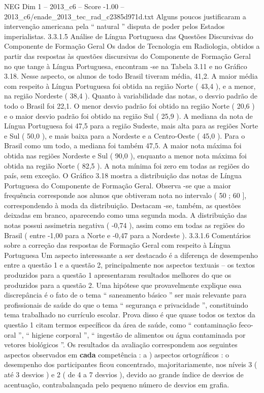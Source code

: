 \begin{textsample}{NEG Dim 1 – 2013\_c6 – Score -1.00 – 2013\_c6/enade\_2013\_tec\_rad\_c2385d971d.txt}
Alguns poucos justificaram a intervenção americana pela “ natural ” disputa de poder pelos Estados imperialistas. 3.3.1.5 Análise de Língua Portuguesa das Questões Discursivas do Componente de Formação Geral Os dados de Tecnologia em Radiologia, obtidos a partir das respostas às questões discursivas do Componente de Formação Geral no que tange à Língua Portuguesa, encontram -se na Tabela 3.11 e no Gráfico 3.18.
Nesse aspecto, os alunos de todo Brasil tiveram média, 41,2.
A maior média com respeito à Língua Portuguesa foi obtida na região Norte ( 43,4 ), e a menor, na região Nordeste ( 38,4 ).
Quanto à variabilidade das notas, o desvio padrão de todo o Brasil foi 22,1.
O menor desvio padrão foi obtido na região Norte ( 20,6 ) e o maior desvio padrão foi obtido na região Sul ( 25,9 ).
A mediana da nota de Língua Portuguesa foi 47,5 para a região Sudeste, mais alta para as regiões Norte e Sul ( 50,0 ), e mais baixa para a Nordeste e a Centro-Oeste ( 45,0 ).
Para o Brasil como um todo, a mediana foi também 47,5.
A maior nota máxima foi obtida nas regiões Nordeste e Sul ( 90,0 ), enquanto a menor nota máxima foi obtida na região Norte ( 82,5 ).
A nota mínima foi zero em todas as regiões do país, sem exceção.
O Gráfico 3.18 mostra a distribuição das notas de Língua Portuguesa do Componente de Formação Geral.
Observa -se que a maior frequência corresponde aos alunos que obtiveram nota no intervalo ( 50 ; 60 ], correspondendo à moda da distribuição.
Destacam -se, também, as questões deixadas em branco, aparecendo como uma segunda moda.
A distribuição das notas possui assimetria negativa ( -0,74 ), assim como em todas as regiões do Brasil ( entre -1,00 para a Norte e -0,47 para a Nordeste ). 3.3.1.6 Comentários sobre a correção das respostas de Formação Geral com respeito à Língua Portuguesa Um aspecto interessante a ser destacado é a diferença de desempenho entre a questão 1 e a questão 2, principalmente nos aspectos textuais – os textos produzidos para a questão 1 apresentaram resultados melhores do que os produzidos para a questão 2.
Uma hipótese que provavelmente explique essa discrepância é o fato de o tema “ saneamento básico ” ser mais relevante para profissionais de saúde do que o tema “ segurança e privacidade ”, constituindo tema trabalhado no currículo escolar.
Prova disso é que quase todos os textos da questão 1 citam termos específicos da área de saúde, como “ contaminação feco-oral ”, “ higiene corporal ”, “ ingestão de alimentos ou água contaminada por vetores biológicos ”.
Os resultados da avaliação correspondem aos seguintes aspectos observados em \textbf{cada} competência : a ) aspectos ortográficos : o desempenho dos participantes ficou concentrado, majoritariamente, nos níveis 3 ( até 3 desvios ) e 2 ( de 4 a 7 desvios ), devido ao grande índice de desvios de acentuação, contrabalançada pelo pequeno número de desvios em grafia.

\end{textsample}

